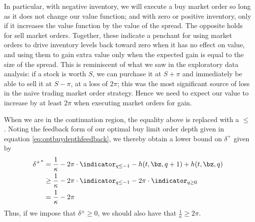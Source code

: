 \documentclass[12pt]{article}
\begin{document}
In particular, with negative inventory, we will execute a buy market order so long as it does not change our value function; and with zero or positive inventory, only if it increases the value function by the value of the spread. The opposite holds for sell market orders. Together, these indicate a penchant for using market orders to drive inventory levels back toward zero when it has no effect on value, and using them to gain extra value only when the expected gain is equal to the size of the spread. This is reminiscent of what we saw in the exploratory data analysis: if a stock is worth $S$, we can purchase it at $S+\pi$ and immediately be able to sell it at $S-\pi$, at a loss of $2 \pi$; this was the most significant source of loss in the naive trading market order strategy. Hence we need to expect our value to increase by at least $2\pi$ when executing market orders for gain.

When we are in the continuation region, the equality above is replaced with a $\leq$. Noting the feedback form of our optimal buy limit order depth given in equation \ref{eq:optbuydepthfeedback}, we thereby obtain a lower bound on $\delta^+$ given by
\begin{align*}
{\delta^+}^* & = \frac{1}{\kappa} - 2 \pi \cdot \indicator_{q \leq -1} - h(t,\bz,q+1) + h(t,\bz,q) \\
& \geq \frac{1}{\kappa} - 2 \pi \cdot \indicator_{q \leq -1} - 2 \pi \cdot \indicator_{q \geq 0} \\
& = \frac{1}{\kappa} - 2 \pi
\end{align*}
Thus, if we impose that $\delta^\pm \geq 0$, we should also have that $\frac{1}{\kappa} \geq 2 \pi$.
\end{document}

